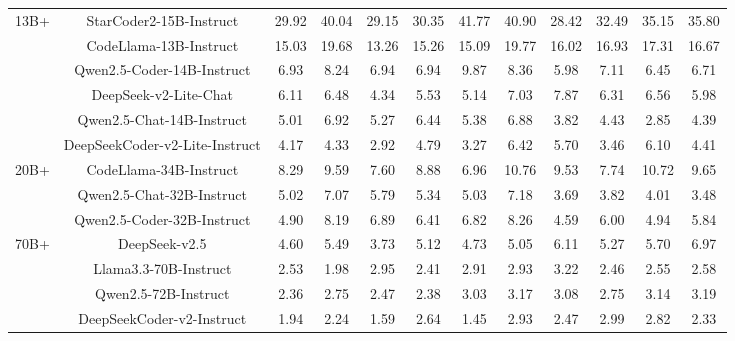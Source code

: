 \documentclass[11pt, a4paper, logo, copyright, nonumbering, amsart]{map}
\begin{document}
\begin{CJK*}{UTF8}{gbsn}
\begin{table*}[h!]
\begin{adjustbox}{width=\textwidth}
\begin{tabular}{c|c|cccccccccc}
    \midrule
    \multirow{6}{*}{13B+} 
    & StarCoder2-15B-Instruct & 29.92 & 40.04 & 29.15 & 30.35 & 41.77 & 40.90 & 28.42 & 32.49 & 35.15 & 35.80 \\
    & CodeLlama-13B-Instruct & 15.03 & 19.68 & 13.26 & 15.26 & 15.09 & 19.77 & 16.02 & 16.93 & 17.31 & 16.67 \\
    & Qwen2.5-Coder-14B-Instruct & 6.93 & 8.24 & 6.94 & 6.94 & 9.87 & 8.36 & 5.98 & 7.11 & 6.45 & 6.71 \\
    & DeepSeek-v2-Lite-Chat & 6.11 & 6.48 & 4.34 & 5.53 & 5.14 & 7.03 & 7.87 & 6.31 & 6.56 & 5.98 \\
    & Qwen2.5-Chat-14B-Instruct & 5.01 & 6.92 & 5.27 & 6.44 & 5.38 & 6.88 & 3.82 & 4.43 & 2.85 & 4.39 \\
    & DeepSeekCoder-v2-Lite-Instruct & 4.17 & 4.33 & 2.92 & 4.79 & 3.27 & 6.42 & 5.70 & 3.46 & 6.10 & 4.41 \\
    
    \midrule
    \multirow{3}{*}{20B+} 
    & CodeLlama-34B-Instruct & 8.29 & 9.59 & 7.60 & 8.88 & 6.96 & 10.76 & 9.53 & 7.74 & 10.72 & 9.65 \\
    & Qwen2.5-Chat-32B-Instruct & 5.02 & 7.07 & 5.79 & 5.34 & 5.03 & 7.18 & 3.69 & 3.82 & 4.01 & 3.48 \\
    & Qwen2.5-Coder-32B-Instruct & 4.90 & 8.19 & 6.89 & 6.41 & 6.82 & 8.26 & 4.59 & 6.00 & 4.94 & 5.84 \\
    
    \midrule
    \multirow{4}{*}{70B+} 
    & DeepSeek-v2.5 & 4.60 & 5.49 & 3.73 & 5.12 & 4.73 & 5.05 & 6.11 & 5.27 & 5.70 & 6.97 \\
    & Llama3.3-70B-Instruct & 2.53 & 1.98 & 2.95 & 2.41 & 2.91 & 2.93 & 3.22 & 2.46 & 2.55 & 2.58 \\
    & Qwen2.5-72B-Instruct & 2.36 & 2.75 & 2.47 & 2.38 & 3.03 & 3.17 & 3.08 & 2.75 & 3.14 & 3.19 \\
    & DeepSeekCoder-v2-Instruct & 1.94 & 2.24 & 1.59 & 2.64 & 1.45 & 2.93 & 2.47 & 2.99 & 2.82 & 2.33 \\
    

\end{tabular}
\end{adjustbox}
\end{table*}
\end{CJK*}
\end{document}

